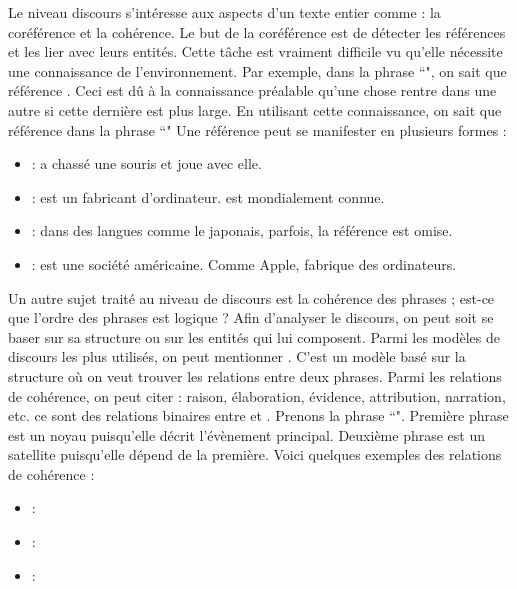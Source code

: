 \documentclass{KodeBook}
\begin{document}
Le niveau discours s'intéresse aux aspects d'un texte entier comme : la coréférence et la cohérence.
Le but de la coréférence est de détecter les références et les lier avec leurs entités. 
Cette tâche est vraiment difficile vu qu'elle nécessite une connaissance de l'environnement. 
Par exemple, dans la phrase ``", on sait que  référence . 
Ceci est dû à la connaissance préalable qu'une chose rentre dans une autre si cette dernière est plus large.
En utilisant cette connaissance, on sait que  référence  dans la phrase ``"
Une référence peut se manifester en plusieurs formes :
\begin{itemize}
	\item {} :  a chassé une souris et  joue avec elle.
	\item {} :  est un fabricant d'ordinateur.  est mondialement connue.
	\item {} : dans des langues comme le japonais, parfois, la référence est omise.
	\item {} : est une société américaine. Comme Apple,  fabrique des ordinateurs.
\end{itemize}

Un autre sujet traité au niveau de discours est la cohérence des phrases ; est-ce que l'ordre des phrases est logique ?
Afin d'analyser le discours, on peut soit se baser sur sa structure ou sur les entités qui lui composent. 
Parmi les modèles de discours les plus utilisés, on peut mentionner .
C'est un modèle basé sur la structure où on veut trouver les relations entre deux phrases. 
Parmi les relations de cohérence, on peut citer : raison, élaboration, évidence, attribution, narration, etc.
ce sont des relations binaires entre  et .
Prenons la phrase ``".
Première phrase est un noyau puisqu'elle décrit l'évènement principal.
Deuxième phrase est un satellite puisqu'elle dépend de la première.
Voici quelques exemples des relations de cohérence : 
\begin{itemize}
	\item {} : 
	\item {} : 
	\item {} : 
\end{itemize}
\end{document}
